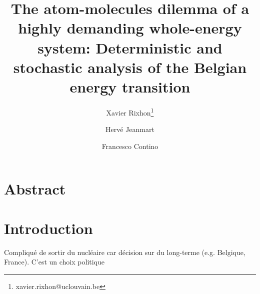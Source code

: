 \documentclass[11pt,twoside,a4paper,english]{article}
\begin{document}
\begin{titlepage}


\title{The atom-molecules dilemma of a highly demanding whole-energy system: Deterministic and stochastic analysis of the Belgian energy transition}

\author[1]{Xavier Rixhon\thanks{xavier.rixhon@uclouvain.be}}
\author[1]{Hervé Jeanmart}
\author[1]{Francesco Contino}







\date{} %
{\let\newpage\relax\maketitle}

\tableofcontents
\printglossaries

\end{titlepage}



\section*{Abstract}

\section{Introduction}
\label{sec:intro}
Compliqué de sortir du nucléaire car décision sur du long-terme (e.g. Belgique, France). C'est un choix politique
\end{document}

